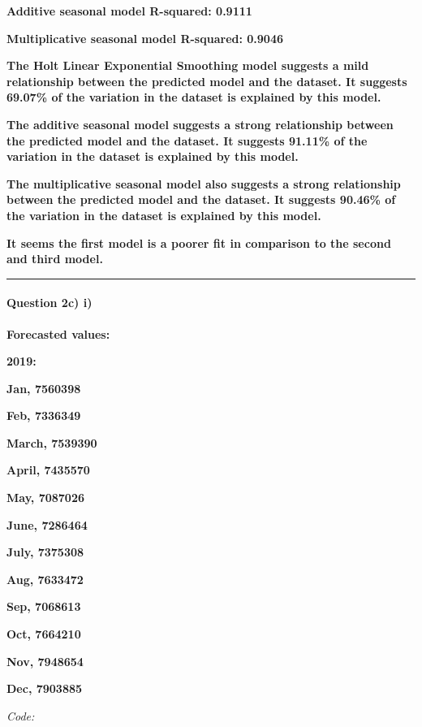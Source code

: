 \documentclass[]{article}
\newenvironment{Shaded}{\begin{snugshade}}{\end{snugshade}}
\newcommand{\CommentTok}[1]{\textcolor[rgb]{0.56,0.35,0.01}{\textit{#1}}}
\newcommand{\KeywordTok}[1]{\textcolor[rgb]{0.13,0.29,0.53}{\textbf{#1}}}
\newcommand{\NormalTok}[1]{#1}
\newcommand{\OperatorTok}[1]{\textcolor[rgb]{0.81,0.36,0.00}{\textbf{#1}}}
\let\oldparagraph\paragraph
\renewcommand{\paragraph}[1]{\oldparagraph{#1}\mbox{}}
\begin{document}
\textbf{Additive seasonal model R-squared: 0.9111}

\textbf{Multiplicative seasonal model R-squared: 0.9046}

\textbf{The Holt Linear Exponential Smoothing model suggests a mild
relationship between the predicted model and the dataset. It suggests
69.07\% of the variation in the dataset is explained by this model. }

\textbf{The additive seasonal model suggests a strong relationship
between the predicted model and the dataset. It suggests 91.11\% of the
variation in the dataset is explained by this model. }

\textbf{The multiplicative seasonal model also suggests a strong
relationship between the predicted model and the dataset. It suggests
90.46\% of the variation in the dataset is explained by this model.}

\textbf{It seems the first model is a poorer fit in comparison to the
second and third model.}

\begin{center}\rule{0.5\linewidth}{0.5pt}\end{center}

\hypertarget{question-2c-i}{%
\paragraph{Question 2c) i)}\label{question-2c-i}}

\textbf{Forecasted values: }

\textbf{2019: }

\textbf{Jan, 7560398 }

\textbf{Feb, 7336349 }

\textbf{March, 7539390 }

\textbf{April, 7435570 }

\textbf{May, 7087026 }

\textbf{June, 7286464 }

\textbf{July, 7375308 }

\textbf{Aug, 7633472 }

\textbf{Sep, 7068613 }

\textbf{Oct, 7664210 }

\textbf{Nov, 7948654 }

\textbf{Dec, 7903885}

\emph{Code:}

\begin{Shaded}
\end{Shaded}
\end{document}
